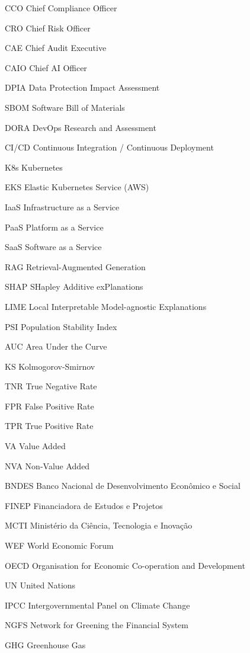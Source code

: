 \begin{siglas}
\item[CCO] Chief Compliance Officer
\item[CRO] Chief Risk Officer
\item[CAE] Chief Audit Executive
\item[CAIO] Chief AI Officer
\item[DPIA] Data Protection Impact Assessment
\item[SBOM] Software Bill of Materials
\item[DORA] DevOps Research and Assessment
\item[CI/CD] Continuous Integration / Continuous Deployment
\item[K8s] Kubernetes
\item[EKS] Elastic Kubernetes Service (AWS)
\item[IaaS] Infrastructure as a Service
\item[PaaS] Platform as a Service
\item[SaaS] Software as a Service
\item[RAG] Retrieval-Augmented Generation
\item[SHAP] SHapley Additive exPlanations
\item[LIME] Local Interpretable Model-agnostic Explanations
\item[PSI] Population Stability Index
\item[AUC] Area Under the Curve
\item[KS] Kolmogorov-Smirnov
\item[TNR] True Negative Rate
\item[FPR] False Positive Rate
\item[TPR] True Positive Rate
\item[VA] Value Added
\item[NVA] Non-Value Added
\item[BNDES] Banco Nacional de Desenvolvimento Econômico e Social
\item[FINEP] Financiadora de Estudos e Projetos
\item[MCTI] Ministério da Ciência, Tecnologia e Inovação
\item[WEF] World Economic Forum
\item[OECD] Organisation for Economic Co-operation and Development
\item[UN] United Nations
\item[IPCC] Intergovernmental Panel on Climate Change
\item[NGFS] Network for Greening the Financial System
\item[GHG] Greenhouse Gas

\end{siglas}
